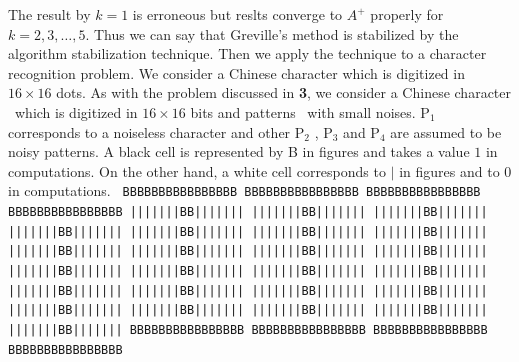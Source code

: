 The result by $k=1 $ is erroneous but reslts converge 
to $A^+ $ properly for $k=2,3,\ldots,5 $.  Thus we can 
say that Greville's method is stabilized by the algorithm 
stabilization technique.  
Then we apply the technique to a character recognition 
problem.  We consider a Chinese character which is 
digitized in $16 \times 16 $ dots. 
As with the problem discussed in {\bf 3}, we consider a 
Chinese character \oh \ which is digitized in $16 \times 16 $ 
bits and patterns \oh \ with small noises.  P$_1 $ corresponds 
to a noiseless character and other P$_2 $ , P$_3 $ and P$_4 $ 
are assumed to be noisy patterns.  A black cell is represented by 
B in figures and takes a value $1 $ in computations.  On the 
other hand, a white cell corresponds to $\mid $ in figures 
and to $0 $ in computations.
\newpage
{\footnotesize 
\tt\offinterlineskip\obeylines
BBBBBBBBBBBBBBBB \hspace{1em} BBBBBBBBBBBBBBBB \hspace{1em} BBBBBBBBBBBBBBBB \hspace{1em} BBBBBBBBBBBBBBBB
|||||||BB||||||| \hspace{1em} |||||||BB||||||| \hspace{1em} |||||||BB||||||| \hspace{1em} |||||||BB|||||||
|||||||BB||||||| \hspace{1em} |||||||BB||||||| \hspace{1em} |||||||BB||||||| \hspace{1em} |||||||BB||||||| 
|||||||BB||||||| \hspace{1em} |||||||BB||||||| \hspace{1em} |||||||BB||||||| \hspace{1em} |||||||BB|||||||
|||||||BB||||||| \hspace{1em} |||||||BB||||||| \hspace{1em} |||||||BB||||||| \hspace{1em} |||||||BB|||||||
|||||||BB||||||| \hspace{1em} |||||||BB||||||| \hspace{1em} |||||||BB||||||| \hspace{1em} |||||||BB|||||||   
|||||||BB||||||| \hspace{1em} |||||||BB||||||| \hspace{1em} |||||||BB||||||| \hspace{1em} |||||||BB|||||||
BBBBBBBBBBBBBBBB \hspace{1em} BBBBBBBBBBBBBBBB \hspace{1em} BBBBBBBBBBBBBBBB \hspace{1em} BBBBBBBBBBBBBBBB
}
